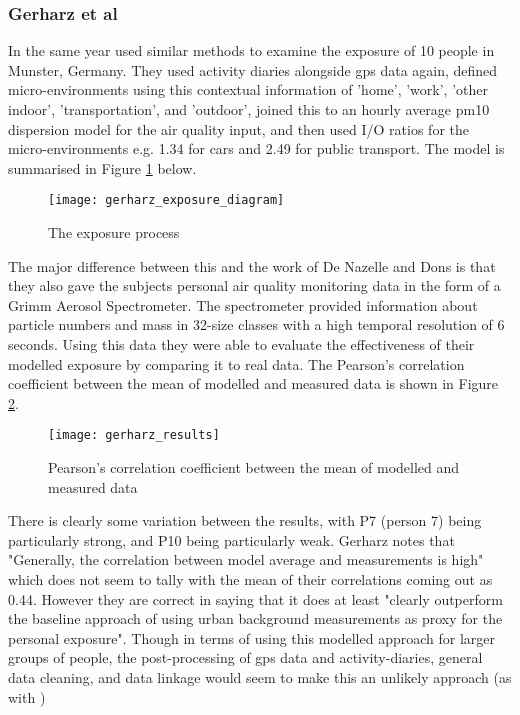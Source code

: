 \subsubsection{Gerharz et al}
\label{sec:dynamic_models_gerharz}

In the same year \cite{Gerharz2013} used similar methods to examine the exposure of 10 people in Munster, Germany. They used activity diaries alongside \gls{gps} data again, defined micro-environments using this contextual information of 'home', 'work', 'other indoor', 'transportation', and 'outdoor', joined this to an hourly average \gls{pm10} dispersion model for the air quality input, and then used I/O ratios for the micro-environments e.g. 1.34 for cars and 2.49 for public transport. The model is summarised in Figure \ref{fig:gerharz_exposure_diagram} below.

\begin{figure}[H]
\centering
\texttt{[image: gerharz\_exposure\_diagram]}
\caption{The exposure process}
\label{fig:gerharz_exposure_diagram}
\end{figure}

The major difference between this and the work of De Nazelle and Dons is that they also gave the subjects personal air quality monitoring data in the form of a Grimm Aerosol Spectrometer. The spectrometer provided information about particle numbers and mass in 32-size classes with a high temporal resolution of 6 seconds. Using this data they were able to evaluate the effectiveness of their modelled exposure by comparing it to real data. The Pearson’s correlation coefficient between the mean of modelled and measured data is shown in Figure \ref{fig:gerharz_results}.

\begin{figure}[H]
\centering
\texttt{[image: gerharz\_results]}
\caption{Pearson’s correlation coefficient between the mean of modelled and measured data}
\label{fig:gerharz_results}
\end{figure}

There is clearly some variation between the results, with P7 (person 7) being particularly strong, and P10 being particularly weak. Gerharz notes that "Generally, the correlation between model average and measurements is high" which does not seem to tally with the mean of their correlations coming out as 0.44. However they are correct in saying that it does at least "clearly outperform the baseline approach of using urban background measurements as proxy for the personal exposure". Though in terms of using this modelled approach for larger groups of people, the post-processing of \gls{gps} data and activity-diaries, general data cleaning, and data linkage would seem to make this an unlikely approach (as with \cite{DeNazelle2013})

